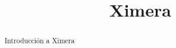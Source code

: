 \documentclass{xourse}
\title{Ximera}
\begin{document}
  

\begin{abstract} 
	Introducción a Ximera
\end{abstract}  

\maketitle  
 
 

 
 
\end{document}

